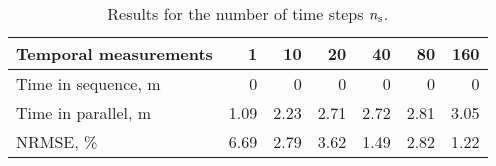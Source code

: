\begin{table}[h]
  \centering
  \caption{Results for the number of time steps ${n_\text{s}}$.}
  \begin{tabular*}{1\linewidth}{lrrrrrr}
    \toprule
    Temporal measurements & 1 & 10 & 20 & 40 & 80 & 160 \\
    \midrule
    Time in sequence, m & 0 & 0 & 0 & 0 & 0 & 0 \\
    Time in parallel, m & 1.09 & 2.23 & 2.71 & 2.72 & 2.81 & 3.05 \\
    NRMSE, \%           & 6.69 & 2.79 & 3.62 & 1.49 & 2.82 & 1.22 \\
    \bottomrule
  \end{tabular*}
  \vspace{-1em}
\end{table}
